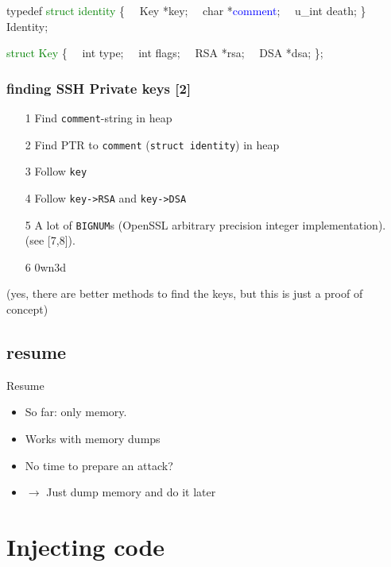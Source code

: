 \documentclass{beamer}
\newenvironment{itemizeframe}[1]
  {\begin{frame}{#1}\startitemizeframe}
  {\stopitemizeframe\end{frame}}
\newcommand\startitemizeframe{\begin{itemize}}
\newcommand\stopitemizeframe{\end{itemize}}
\begin{document}
		\begin{frame}[fragile]
			\begin{semiverbatim}
				typedef \textcolor{green}{struct identity} \{
				\ \ 	Key *key;
				\ \ 	char *\textcolor{blue}{comment};
				\ \ 	u_int death;
				\} Identity;

				\textcolor{green}{struct Key} \{
				\ \ 	int      type;
				\ \ 	int      flags;
				\ \ 	RSA     *rsa;
				\ \ 	DSA     *dsa;
				\};
			\end{semiverbatim}
		\end{frame}

		\begin{frame} \frametitle{finding SSH Private keys [2]}
			\begin{itemize}
				\item[1] Find \texttt{comment}-string in heap
				\item[2] Find PTR to \texttt{comment} (\texttt{struct identity}) in heap
				\item[3] Follow \texttt{key}
				\item[4] Follow \texttt{key->RSA} and \texttt{key->DSA}
				\item[5] A lot of \texttt{BIGNUM}s (OpenSSL arbitrary precision integer implementation).
					  (see [7,8]).
				\item[6] 0wn3d
			\end{itemize}
			\scriptsize (yes, there are better methods to find the keys, but this is just a proof of concept)
		\end{frame}

	\subsection{resume}

		\begin{itemizeframe}{Resume}
			\item So far: only  memory.
			\item Works with memory dumps
			\item No time to prepare an attack?
			\item $\rightarrow$ Just dump memory and do it later
		\end{itemizeframe}

\section{Injecting code}
\end{document}
